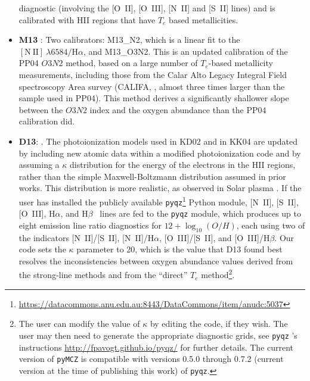 \documentclass{emulateapj}
\newcommand{\oxabinline}{\ensuremath{12 + \log_{10}(O/H)}}
\newcommand{\ha}{\ensuremath{\mathrm{H}\alpha}}
\newcommand{\hb}{\ensuremath{\mathrm{H}\beta}}
\begin{document}
\begin{itemize}
  diagnostic (involving the [O~II], [O~III], [N~II] and [S~II] lines)
  and is calibrated with HII regions that have $T_e$ based
  metallicities.
\item {\bf M13} \citep{marino13}: Two calibrators: M13\_N2, which is a
  linear fit to the $\mathrm{[N~II]}~\lambda6584/\ha$, and
  M13\_O3N2. This is an updated calibration of the PP04 $O3N2$ method,
  based on a large number of $T_e$-based metallicity measurements,
  including those from the Calar Alto Legacy Integral Field
  spectroscopy Area survey (CALIFA, \citealt{sanchez12}, almost three
  times larger than the sample used in PP04). This method derives a
  significantly shallower slope between the $O3N2$ index and the
  oxygen abundance than the PP04 calibration did.
\item {\bf D13}: \citep{dopita13}. The photoionization models used in
  KD02 and in KK04 are updated by including new atomic data within a
  modified photoionization code and by assuming a $\kappa$
  distribution for the energy of the electrons in the HII regions,
  rather than the simple Maxwell-Boltzmann distribution assumed in
  prior works. This distribution is more realistic, as observed in
  Solar plasma \citep{nicholls12}. If the user has installed the
  publicly available
  \verb=pyqz=\footnote{\url{https://datacommons.anu.edu.au:8443/DataCommons/item/anudc:5037}}
  Python module, [N~II], [S~II], [O~III], \ha, and \hb~ lines are fed
  to the \verb=pyqz= module, which produces up to eight emission line
  ratio diagnostics for \oxabinline, each using two of the indicators
  [N~II]/[S~II], [N~II]/\ha, [O~III]/[S~II], and [O~III]/\hb. Our code
  sets the $\kappa$ parameter to 20, which is the value that D13 found
  best resolves the inconsistencies between oxygen abundance values
  derived from the strong-line methods and from the ``direct'' $T_e$
  method\footnote{The user can modify the value of $\kappa$ by editing
    the code, if they wish. The user may then need to generate the
    appropriate diagnostic grids, see \texttt{pyqz} ’s instructions
    \url{http://fpavogt.github.io/pyqz/} for further details. The
    current version of \texttt{pyMCZ} is compatible with versions 0.5.0 through
    0.7.2 (current version at the time of publishing this work) of  \texttt{pyqz}.}.


\end{itemize}
\end{document}
